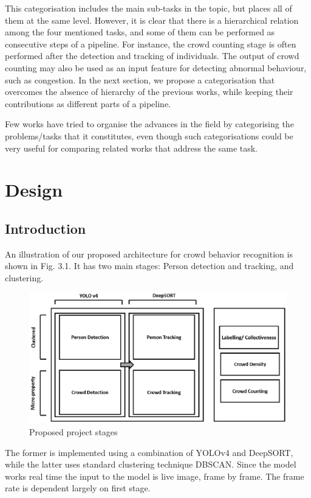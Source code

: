 \documentclass{fisatprojectfinal}
\begin{document}
This categorisation includes the main sub-tasks in the topic, but places all of them at the same level. However, it is clear that there is a hierarchical relation among the four mentioned tasks, and some of them can be performed as consecutive steps of a pipeline. For instance, the crowd counting stage is often performed after the detection and tracking of individuals. The output of crowd counting may also be used as an input feature for detecting abnormal behaviour, such as congestion. In the next section, we propose a categorisation that overcomes the absence of hierarchy of the previous works, while keeping their contributions as different parts of a pipeline.

Few works have tried to organise the advances in the field by categorising the problems/tasks that it constitutes, even though such categorisations could be very useful for comparing related works that address the same task. 


\chapter{Design}
\section{Introduction}
An illustration of our proposed architecture for crowd behavior recognition is shown in Fig. 3.1. It has two main stages: Person detection and tracking, and clustering. 

\begin{figure}[h!]
\begin{center}
\includegraphics[scale=0.95]{img_pipelinebasic.eps}
\caption{Proposed project stages}
\end{center}
\end{figure}

The former is implemented using a combination of YOLOv4 and DeepSORT, while the latter uses standard clustering technique DBSCAN. Since the model works real time the input to the model is live image, frame by frame. The frame rate is dependent largely on first stage.  
\end{document}
